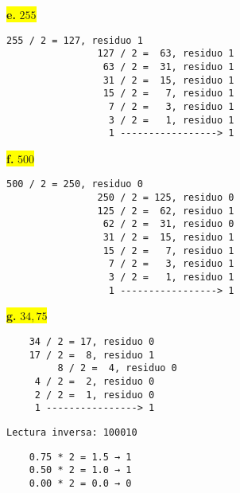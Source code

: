 \documentclass[a4paper,12pt]{article}
\begin{document}
		\newpage
		\begin{center}
			\colorbox{yellow}{{\textbf{e.} $255$}}
			\begin{Verbatim}[formatcom=\centering]
				255 / 2 = 127, residuo 1
				127 / 2 =  63, residuo 1
				 63 / 2 =  31, residuo 1
 				 31 / 2 =  15, residuo 1
				 15 / 2 =   7, residuo 1
				  7 / 2 =   3, residuo 1
				  3 / 2 =   1, residuo 1
				  1 -----------------> 1
			\end{Verbatim}
			\hspace{1.7cm}
		\end{center}
		\begin{center}
			\colorbox{yellow}{{\textbf{f.} $500$}}
			\begin{Verbatim}[formatcom=\centering]
				500 / 2 = 250, residuo 0
				250 / 2 = 125, residuo 0
				125 / 2 =  62, residuo 1
				 62 / 2 =  31, residuo 0
				 31 / 2 =  15, residuo 1
				 15 / 2 =   7, residuo 1
				  7 / 2 =   3, residuo 1
				  3 / 2 =   1, residuo 1
				  1 -----------------> 1
			\end{Verbatim}
			\hspace{1.7cm}
		\end{center}
		\begin{center}
			\colorbox{yellow}{{\textbf{g.} $34,75$}} \\ \vspace{0.3cm}
		\end{center}	
		\vspace{-1em}
		\begin{minipage}[t]{0.40\textwidth}
		\hspace{2,5cm}
		
\begin{Verbatim}
	34 / 2 = 17, residuo 0
	17 / 2 =  8, residuo 1
         8 / 2 =  4, residuo 0
	 4 / 2 =  2, residuo 0
	 2 / 2 =  1, residuo 0
	 1 ----------------> 1
\end{Verbatim}
		\hspace{1,5cm}\texttt{Lectura inversa: 100010}
		\end{minipage}
	\hfill
	\begin{minipage}[t]{0.40\textwidth}
	\hspace{2cm}
	
\begin{Verbatim}
	0.75 * 2 = 1.5 → 1 
	0.50 * 2 = 1.0 → 1 
	0.00 * 2 = 0.0 → 0 
\end{Verbatim}
	\end{minipage}
\begin{center}
\hspace{2cm}
\end{center}
\end{document}
